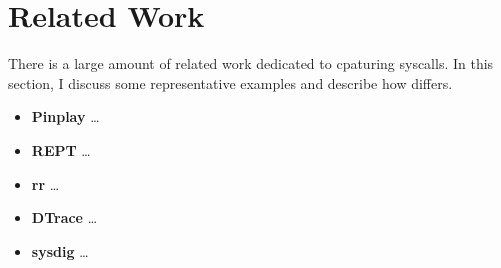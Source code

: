 \section{Related Work}
There is a large amount of related work dedicated to cpaturing syscalls. In this section, I discuss some representative examples and describe
how \TheName differs.

\begin{itemize}
    \item \textbf{Pinplay} \dots
    \item \textbf{REPT} \dots
    \item \textbf{rr} \dots
    \item \textbf{DTrace} \dots
    \item \textbf{sysdig} \dots
\end{itemize}


